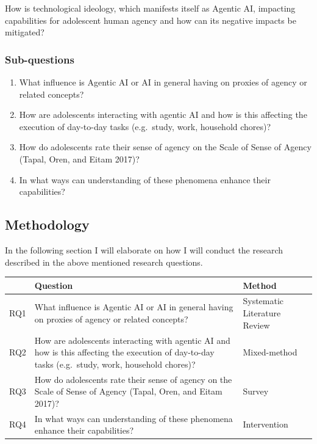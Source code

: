\documentclass[
  letterpaper,
  DIV=11,
  numbers=noendperiod]{scrartcl}
\providecommand{\tightlist}{%
  \setlength{\itemsep}{0pt}\setlength{\parskip}{0pt}}
\begin{document}
How is technological ideology, which manifests itself as Agentic AI,
impacting capabilities for adolescent human agency and how can its
negative impacts be mitigated?

\subsubsection{Sub-questions}\label{sub-questions}

\begin{enumerate}
\def\labelenumi{\arabic{enumi}.}
\tightlist
\item
  What influence is Agentic AI or AI in general having on proxies of
  agency or related concepts?
\item
  How are adolescents interacting with agentic AI and how is this
  affecting the execution of day-to-day tasks (e.g.~study, work,
  household chores)?
\item
  How do adolescents rate their sense of agency on the Scale of Sense of
  Agency (Tapal, Oren, and Eitam 2017)?
\item
  In what ways can understanding of these phenomena enhance their
  capabilities?
\end{enumerate}

\subsection{Methodology}\label{methodology}

In the following section I will elaborate on how I will conduct the
research described in the above mentioned research questions.

\begin{longtable}[]{@{}
  >{\raggedright\arraybackslash}p{}
  >{\raggedright\arraybackslash}p{}
  >{\raggedright\arraybackslash}p{}@{}}
\toprule\noalign{}
\begin{minipage}[b]{\linewidth}\raggedright
\end{minipage} & \begin{minipage}[b]{\linewidth}\raggedright
Question
\end{minipage} & \begin{minipage}[b]{\linewidth}\raggedright
Method
\end{minipage} \\
\midrule\noalign{}
\endhead
\bottomrule\noalign{}
\endlastfoot
RQ1 & What influence is Agentic AI or AI in general having on proxies of
agency or related concepts? & Systematic Literature Review \\
RQ2 & How are adolescents interacting with agentic AI and how is this
affecting the execution of day-to-day tasks (e.g.~study, work, household
chores)? & Mixed-method \\
RQ3 & How do adolescents rate their sense of agency on the Scale of
Sense of Agency (Tapal, Oren, and Eitam 2017)? & Survey \\
RQ4 & In what ways can understanding of these phenomena enhance their
capabilities? & Intervention \\
\end{longtable}
\end{document}
